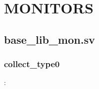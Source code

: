 \documentclass{note}
\begin{document}
\section{MONITORS}
\subsection{base\_lib\_mon.sv}
\subsubsection{collect\_type0}
\bit
\w {}:
  \bit
\end{document}

